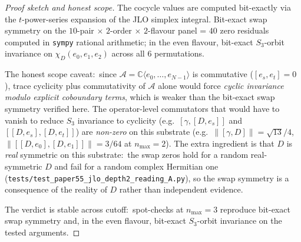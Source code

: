 \documentclass[11pt,a4paper]{article}
\theoremstyle{plain}
\theoremstyle{definition}
\begin{document}
\begin{proof}[Proof sketch and honest scope]
The cocycle values are computed bit-exactly via the $t$-power-series
expansion of the JLO simplex integral.  Bit-exact swap symmetry on the $10$-pair $\times$ $2$-order $\times$
$2$-flavour panel = $40$ zero residuals computed in \texttt{sympy}
rational arithmetic; in the even flavour, bit-exact $S_3$-orbit
invariance on $\chi_D(e_0, e_1, e_2)$ across all $6$ permutations.

The honest scope caveat:\ since
$\mathcal{A} = \mathbb{C}\langle e_0, \ldots, e_{N - 1}\rangle$ is
commutative ($[e_s, e_t] = 0$), trace cyclicity plus commutativity
of $\mathcal{A}$ alone would force \emph{cyclic invariance modulo
explicit coboundary terms}, which is weaker than the bit-exact
swap symmetry verified here.  The operator-level
commutators that would have to vanish to reduce $S_3$ invariance
to cyclicity (e.g.\ $[\gamma, [D, e_s]]$ and
$[[D, e_s], [D, e_t]]$) are
\emph{non-zero} on this substrate (e.g.\ $\|[\gamma, D]\| = \sqrt{13}/4$,
$\|[[D, e_0], [D, e_1]]\| = 3/64$ at $n_{\max} = 2$).  The extra
ingredient is that $D$ is \emph{real} symmetric on this substrate:\ the
swap zeros hold for a random real-symmetric $D$ and fail for a random complex
Hermitian one
(\texttt{tests/test\_paper55\_jlo\_depth2\_reading\_A.py}), so the swap
symmetry is a consequence of the reality of $D$ rather than independent
evidence.

The verdict is stable across cutoff:\ spot-checks at
$n_{\max} = 3$ reproduce bit-exact swap symmetry and, in the even
flavour, bit-exact $S_3$-orbit invariance on the tested arguments.
\end{proof}
\end{document}

